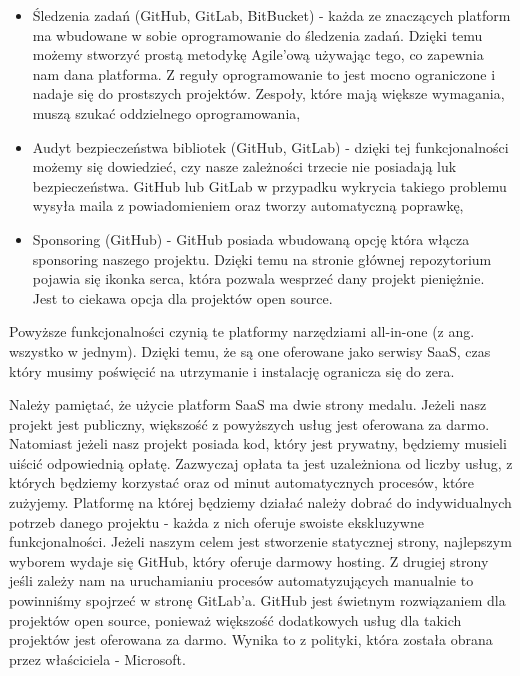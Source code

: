 \begin{itemize}
    \item Śledzenia zadań (GitHub, GitLab, BitBucket) - każda ze znaczących platform ma wbudowane w sobie oprogramowanie do śledzenia zadań. Dzięki temu możemy stworzyć prostą metodykę Agile'ową używając tego, co zapewnia nam dana platforma. Z reguły oprogramowanie to jest mocno ograniczone i nadaje się do prostszych projektów. Zespoły, które mają większe wymagania, muszą szukać oddzielnego oprogramowania,
    \item Audyt bezpieczeństwa bibliotek (GitHub, GitLab) - dzięki tej funkcjonalności możemy się dowiedzieć, czy nasze zależności trzecie nie posiadają luk bezpieczeństwa. GitHub lub GitLab w przypadku wykrycia takiego problemu wysyła maila z powiadomieniem oraz tworzy automatyczną poprawkę,
    \item Sponsoring (GitHub) - GitHub posiada wbudowaną opcję która włącza sponsoring naszego projektu. Dzięki temu na stronie głównej repozytorium pojawia się ikonka serca, która pozwala wesprzeć dany projekt pieniężnie. Jest to ciekawa opcja dla projektów open source.
\end{itemize}
Powyższe funkcjonalności czynią te platformy narzędziami all-in-one (z ang. wszystko w jednym). Dzięki temu, że są one oferowane jako serwisy SaaS, czas który musimy poświęcić na utrzymanie i instalację ogranicza się do zera.
\par
Należy pamiętać, że użycie platform SaaS ma dwie strony medalu. Jeżeli nasz projekt jest publiczny, większość z powyższych usług jest oferowana za darmo. Natomiast jeżeli nasz projekt posiada kod, który jest prywatny, będziemy musieli uiścić odpowiednią opłatę. Zazwyczaj opłata ta jest uzależniona od liczby usług, z których będziemy korzystać oraz od minut automatycznych procesów, które zużyjemy. Platformę na której będziemy działać należy dobrać do indywidualnych potrzeb danego projektu - każda z nich oferuje swoiste ekskluzywne funkcjonalności. Jeżeli naszym celem jest stworzenie statycznej strony, najlepszym wyborem wydaje się GitHub, który oferuje darmowy hosting. Z drugiej strony jeśli zależy nam na uruchamianiu procesów automatyzujących manualnie to powinniśmy spojrzeć w stronę GitLab'a. GitHub jest świetnym rozwiązaniem dla projektów open source, ponieważ większość dodatkowych usług dla takich projektów jest oferowana za darmo. Wynika to z polityki, która została obrana przez właściciela - Microsoft.
